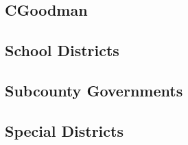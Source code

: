 \documentclass{article}
\begin{document}
{	\subsection{CGoodman}
	
	\clearpage
	

	\subsection{School Districts}
	

	\clearpage
	
	\subsection{Subcounty Governments}
	
	\clearpage
	
	
	\subsection{Special Districts}
	
	\clearpage
	
}
\end{document}

